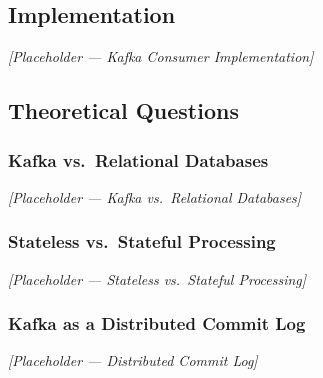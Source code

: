 \documentclass[a4paper,12pt]{extarticle}
\begin{document}
\subsection{Implementation}


\textit{[Placeholder — Kafka Consumer Implementation]}

\subsection{Theoretical Questions}

\subsubsection{Kafka vs.\ Relational Databases}


\textit{[Placeholder — Kafka vs.\ Relational Databases]}

\subsubsection{Stateless vs.\ Stateful Processing}


\textit{[Placeholder — Stateless vs.\ Stateful Processing]}

\subsubsection{Kafka as a Distributed Commit Log}


\textit{[Placeholder — Distributed Commit Log]}
\end{document}
